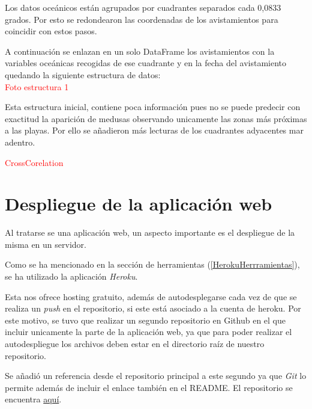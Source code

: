 Los datos oceánicos están agrupados por cuadrantes separados cada 0,0833 grados. Por esto se redondearon las coordenadas de los avistamientos para coincidir con estos pasos. 

A continuación se enlazan en un solo DataFrame los avistamientos con la variables oceánicas recogidas de ese cuadrante y en la fecha del avistamiento quedando la siguiente estructura de datos:\\
\textcolor{red}{Foto estructura 1}

Esta estructura inicial, contiene poca información pues no se puede predecir con exactitud la aparición de medusas observando unicamente las zonas más próximas a las playas. Por ello se añadieron más lecturas de los cuadrantes adyacentes mar adentro.


\textcolor{red}{CrossCorelation}


\section{Despliegue de la aplicación web}
Al tratarse se una aplicación web, un aspecto importante es el despliegue de la misma en un servidor.

Como se ha mencionado en la sección de herramientas (\ref{HerokuHerrramientas}), se ha utilizado la aplicación \emph{Heroku}.

Esta nos ofrece hosting gratuito, además de autodesplegarse cada vez de que se realiza un \emph{push} en el repositorio, si este está asociado a la cuenta de heroku. Por este motivo, se tuvo que realizar un segundo repositorio en Github en el que incluir unicamente la parte de la aplicación web, ya que para poder realizar el autodespliegue los archivos deben estar en el directorio raíz de nuestro repositorio.

Se añadió un referencia desde el repositorio principal a este segundo ya que \emph{Git} lo permite además de incluir el enlace también en el README. El repositorio se encuentra  \href{https://github.com/psnti/WebJellyfishForecast#tfg---pablo-santidrian-tudanca}{aquí}.



